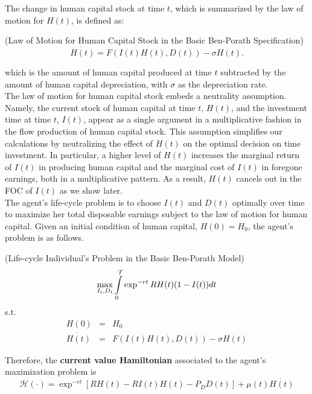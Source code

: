 \indent The change in human capital stock at time $t$, which is summarized by the law of motion for $H(t)$, is defined as: 

\begin{definition} (Law of Motion for Human Capital Stock in the Basic Ben-Porath Specification)
\begin{equation}
\dot{H(t)} = F \left( I(t) H(t), D(t) \right) - \sigma H(t). \label{eq:lawh}
\end{equation}
\end{definition}

\noindent which is the amount of human capital produced at time $t$ subtracted by the amount of human capital depreciation, with $\sigma$ as the depreciation rate.\\
\indent The law of motion for human capital stock embeds a neutrality assumption. Namely, the current stock of human capital at time $t$, $H(t)$, and the investment time at time $t$, $I(t)$, appear as a single argument in a multiplicative fashion in the flow production of human capital stock. This assumption simplifies our calculations by neutralizing the effect of $H(t)$ on the optimal decision on time investment. In particular, a higher level of $H(t)$ increases the marginal return of $I(t)$ in producing human capital and the marginal cost of $I(t)$ in foregone earnings, both in a multiplicative pattern. As a result, $H(t)$ cancels out in the FOC of $I(t)$ as we show later.\\
\indent The agent's life-cycle problem is to choose $I(t)$ and $D(t)$ optimally over time to maximize her total disposable earnings subject to the law of motion for human capital. Given an initial condition of human capital, $H(0)=H_0$, the agent's problem is as follows.

\begin{problem} \label{problem:bbp} (Life-cycle Individual's Problem in the Basic Ben-Porath Model)
\begin{equation}
\max_{{I_{t}, D_{t}}} \int \limits _{0} ^{T} \exp^{-rt} RH(t)(1 - I(t)) dt \nonumber \\
\end{equation}
\noindent s.t.
\begin{eqnarray}
H(0) &=& H_{0} \nonumber \\
\dot{H(t)} &=& F \left( I(t) H(t), D(t) \right) - \sigma H(t) \nonumber
\end{eqnarray}
\end{problem}

\indent Therefore, the \textbf{current value Hamiltonian} associated to the agent's maximization problem is
\begin{equation}
\mathcal{H} (\cdot) = \exp^{-rt} \left[ R H(t) -  R I(t) H(t) - P_{D} D(t) \right] + \mu(t) \dot{H(t)} 
\end{equation}

